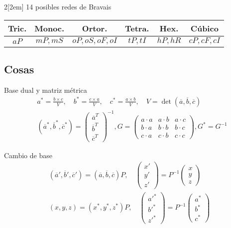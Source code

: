 \documentclass[leqno]{article}
\begin{document}
\begin{multicols}{2}[\columnsep2em]
14 posibles redes de Bravais
\begin{center}
\begin{tabular}{|c|c|c|c|c|c|}
\hline
Tric. & Monoc. & Ortor. & Tetra. & Hex. & Cúbico \\\hline
$aP$ &  $mP, mS$ &  $oP, oS, oF, oI$ &  $tP, tI$ &  $hP, hR$ &  $cP, cF, cI$ \\\hline
\end{tabular}
\end{center}

\subsection{Cosas}
Base dual y matriz métrica
\begin{align*}
  & a^* = \frac{b\times c}{V}, \quad b^* = \frac{c\times a}{V}  , \quad c^* = \frac{a\times b}{V}, \quad V = \det(\overline{a}, \overline{b}, \overline{c})  \\
  & (\overline{a}^*, \overline{b}^*, \overline{c}^*)=\begin{pmatrix} \overline{a}^T\\\overline{b}^T\\\overline{c}^T \end{pmatrix} ^{-1}, G = \begin{pmatrix} a\cdot a & a\cdot b & a\cdot c \\ b\cdot a & b\cdot b & b\cdot c \\ c\cdot a & c\cdot b & c\cdot c \end{pmatrix}, G^* = G^{-1}
\end{align*}

Cambio de base
\begin{align*}
  (\overline{a}', \overline{b}', \overline{c}') = (\overline{a}, \overline{b}, \overline{c})P, \quad \begin{pmatrix} x' \\ y' \\z' \end{pmatrix} =P^{-1} \begin{pmatrix} x\\y\\z \end{pmatrix} \\
  (x, y, z) = (x^*, y^*, z^*)P, \quad \begin{pmatrix} a'^* \\ b'^* \\z'^* \end{pmatrix} =P^{-1} \begin{pmatrix} a^*\\b^*\\c^* \end{pmatrix} 
\end{align*}


\end{multicols}
\end{document}
